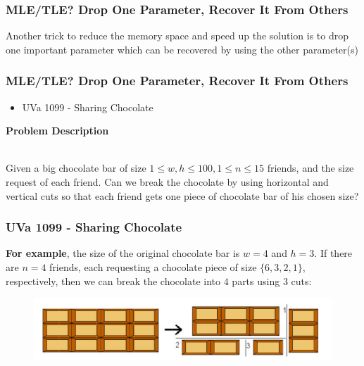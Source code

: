 \documentclass{beamer}
\begin{document}
\begin{frame}[fragile]
\frametitle{MLE/TLE? Drop One Parameter, Recover It From Others}

Another trick to reduce the memory space and speed up the solution is to \color{blue}drop one important parameter \color{black} which can be recovered by using the other parameter(s)

\end{frame}


\begin{frame}[fragile]
\frametitle{MLE/TLE? Drop One Parameter, Recover It From Others}

\begin{itemize}
    \item \color{blue}UVa 1099 - Sharing Chocolate\color{black}
\end{itemize}

\vspace{0.3cm}

\color{red}\textbf{Problem Description}\color{black} \\ 

Given a big chocolate bar of size $1 \leq w, h \leq 100, 1 \leq n \leq 15$ friends, and the size request of each friend. Can we break the chocolate by using horizontal and vertical cuts so that each friend gets one piece of chocolate bar of his chosen size?

\end{frame}

\begin{frame}[fragile]
\frametitle{UVa 1099 - Sharing Chocolate}

\textbf{For example}, the size of the original chocolate bar is $w = 4$ and $h = 3$. If there are $n=4$ friends, each requesting a chocolate piece of size $\{6, 3, 2, 1\}$, respectively, then we can break the chocolate into $4$ parts using $3$ cuts:

\begin{figure}
    \centering
    \includegraphics[scale=0.4]{imgs/uva_1099.png}
\end{figure}

\end{frame}
\end{document}
